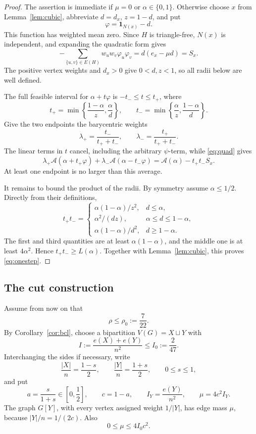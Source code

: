 \documentclass[11pt,reqno]{amsart}
\theoremstyle{plain}
\newcommand{\Nb}{N}
\newcommand{\dens}{\rho}
\begin{document}
\begin{proof}
The assertion is immediate if $\mu=0$ or $\alpha\in\{0,1\}$.  Otherwise
choose $x$ from Lemma~\ref{lem:cubic}, abbreviate
$d=d_x$, $z=1-d$, and put
\[
 \varphi=\mathbf 1_{\Nb(x)}-d.
\]
This function has weighted mean zero.  Since $H$ is triangle-free,
$\Nb(x)$ is independent, and expanding the quadratic form gives
\begin{equation}\label{eq:quad}
 -\sum_{\{u,v\}\in E(H)}w_uw_v\varphi_u\varphi_v
 =d(e_x-\mu d)=S_x.
\end{equation}
The positive vertex weights and $d_x>0$ give $0<d,z<1$, so all radii below
are well defined.

The full feasible interval for $\alpha+t\varphi$ is
$-t_-\le t\le t_+$, where
\[
 t_+=\min\left\{\frac{1-\alpha}{z},\frac\alpha d\right\},
 \qquad
 t_-=\min\left\{\frac\alpha z,\frac{1-\alpha}{d}\right\}.
\]
Give the two endpoints the barycentric weights
\[
 \lambda_+=\frac{t_-}{t_++t_-},\qquad
 \lambda_-=\frac{t_+}{t_++t_-}.
\]
The linear terms in $t$ cancel, including the arbitrary $\psi$-term, while
\eqref{eq:quad} gives
\[
 \lambda_+\mathcal A(\alpha+t_+\varphi)
 +\lambda_-\mathcal A(\alpha-t_-\varphi)
 =\mathcal A(\alpha)-t_+t_-S_x.
\]
At least one endpoint is no larger than this average.

It remains to bound the product of the radii.  By symmetry assume
$\alpha\le1/2$.  Directly from their definitions,
\[
 t_+t_-=\begin{cases}
 \alpha(1-\alpha)/z^2,&d\le\alpha,\\[3pt]
 \alpha^2/(dz),&\alpha\le d\le1-\alpha,\\[3pt]
 \alpha(1-\alpha)/d^2,&d\ge1-\alpha.
 \end{cases}
\]
The first and third quantities are at least $\alpha(1-\alpha)$, and the
middle one is at least $4\alpha^2$.  Hence $t_+t_-\ge L(\alpha)$.
Together with Lemma~\ref{lem:cubic}, this proves \eqref{eq:onestep}.
\end{proof}

\subsection{The cut construction}\label{ssec:low-cut}
Assume from now on that
\begin{equation}\label{eq:low-density}
 \dens\le\dens_0:=\frac7{22}.
\end{equation}
By Corollary~\ref{cor:bcl}, choose a bipartition $V(G)=X\sqcup Y$ with
\[
 I:=\frac{e(X)+e(Y)}{n^2}\le I_0:=\frac2{47}.
\]
Interchanging the sides if necessary, write
\[
 \frac{|X|}{n}=\frac{1-s}{2},\qquad
 \frac{|Y|}{n}=\frac{1+s}{2},\qquad 0\le s\le1,
\]
and put
\[
 a=\frac{s}{1+s}\in\left[0,\frac12\right],
 \qquad c=1-a,\qquad
 I_Y=\frac{e(Y)}{n^2},\qquad
 \mu=4c^2I_Y.
\]
The graph $G[Y]$, with every vertex assigned weight $1/|Y|$, has edge mass
$\mu$, because $|Y|/n=1/(2c)$.  Also
\begin{equation}\label{eq:mu-cap}
 0\le\mu\le4I_0c^2.
\end{equation}
\end{document}
